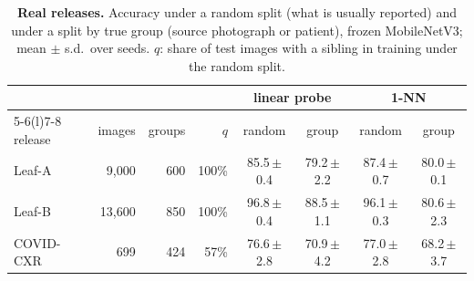 \begin{table}[t]
\centering\small
\caption{\textbf{Real releases.} Accuracy under a random split (what is usually reported) and under a split by true group (source photograph or patient), frozen MobileNetV3; mean $\pm$ s.d.\ over seeds. $q$: share of test images with a sibling in training under the random split.}
\label{tab:real}
\begin{tabular}{@{}lrrr cc cc@{}}
\toprule
& & & & \multicolumn{2}{c}{linear probe} & \multicolumn{2}{c}{1-NN} \\
\cmidrule(lr){5-6}\cmidrule(l){7-8}
release & images & groups & $q$ & random & group & random & group \\
\midrule
Leaf-A & 9,000 & 600 & 100\% & 85.5\,{\scriptsize$\pm$0.4} & 79.2\,{\scriptsize$\pm$2.2} & 87.4\,{\scriptsize$\pm$0.7} & 80.0\,{\scriptsize$\pm$0.1} \\
Leaf-B & 13,600 & 850 & 100\% & 96.8\,{\scriptsize$\pm$0.4} & 88.5\,{\scriptsize$\pm$1.1} & 96.1\,{\scriptsize$\pm$0.3} & 80.6\,{\scriptsize$\pm$2.3} \\
COVID-CXR & 699 & 424 & 57\% & 76.6\,{\scriptsize$\pm$2.8} & 70.9\,{\scriptsize$\pm$4.2} & 77.0\,{\scriptsize$\pm$2.8} & 68.2\,{\scriptsize$\pm$3.7} \\
\bottomrule
\end{tabular}
\end{table}
